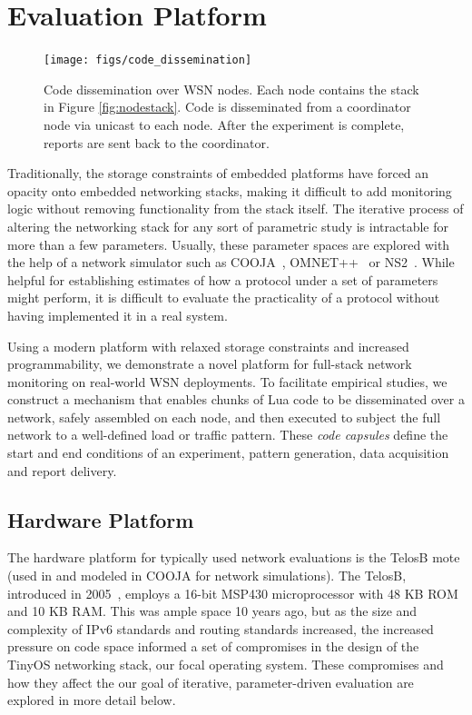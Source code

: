 \section{Evaluation Platform}

\begin{figure}[ht]
\centering
\texttt{[image: figs/code\_dissemination]}
\caption{Code dissemination over WSN nodes. Each node contains the stack in Figure \ref{fig:nodestack}. Code is disseminated from a coordinator node via unicast to each node. After the experiment is complete, reports are sent back to the coordinator.}
\label{fig:dissemination}

\end{figure}

Traditionally, the storage constraints of embedded platforms have forced an opacity onto embedded networking stacks, making it difficult to add monitoring logic without removing functionality from the stack itself.
The iterative process of altering the networking stack for any sort of parametric study is intractable for more than a few parameters.
Usually, these parameter spaces are explored with the help of a network simulator such as COOJA~\cite{cooja}, OMNET++~\cite{omnet++} or NS2~\cite{ns2}.
While helpful for establishing estimates of how a protocol under a set of parameters might perform, it is difficult to evaluate the practicality of a protocol without having implemented it in a real system.

Using a modern platform with relaxed storage constraints and increased programmability, we demonstrate a novel platform for full-stack network monitoring on real-world WSN deployments.
To facilitate empirical studies, we construct a mechanism that enables chunks of Lua code to be disseminated over a network, safely assembled on each node, and then executed to subject the full network to a well-defined load or traffic pattern.
These \emph{code capsules} define the start and end conditions of an experiment, pattern generation, data acquisition and report delivery.

\subsection{Hardware Platform}

The hardware platform for typically used network evaluations is the TelosB mote (used in \cite{ko2011evaluating} and modeled in COOJA for network simulations).
The TelosB, introduced in 2005~\cite{polastre2005telos},  employs a 16-bit MSP430 microprocessor with 48 KB ROM and 10 KB RAM.
This was ample space 10 years ago, but as the size and complexity of IPv6 standards and routing standards increased, the increased pressure on code space informed a set of compromises in the design of the TinyOS networking stack, our focal operating system.
These compromises and how they affect the our goal of iterative, parameter-driven evaluation are explored in more detail below.

